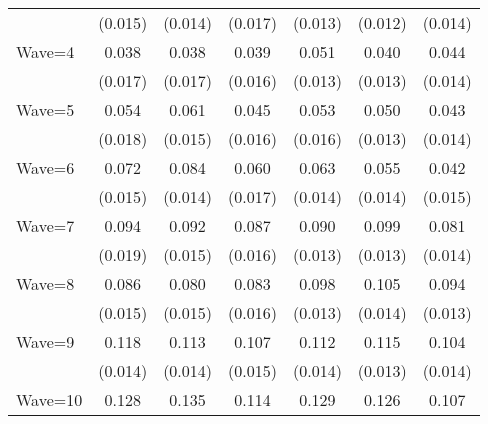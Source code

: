 {\begin{tabular}{l*{6}{c}}
                    &     (0.015)         &     (0.014)         &     (0.017)         &     (0.013)         &     (0.012)         &     (0.014)         \\
Wave=4              &       0.038\sym{**} &       0.038\sym{**} &       0.039\sym{**} &       0.051\sym{***}&       0.040\sym{***}&       0.044\sym{***}\\
                    &     (0.017)         &     (0.017)         &     (0.016)         &     (0.013)         &     (0.013)         &     (0.014)         \\
Wave=5              &       0.054\sym{***}&       0.061\sym{***}&       0.045\sym{***}&       0.053\sym{***}&       0.050\sym{***}&       0.043\sym{***}\\
                    &     (0.018)         &     (0.015)         &     (0.016)         &     (0.016)         &     (0.013)         &     (0.014)         \\
Wave=6              &       0.072\sym{***}&       0.084\sym{***}&       0.060\sym{***}&       0.063\sym{***}&       0.055\sym{***}&       0.042\sym{***}\\
                    &     (0.015)         &     (0.014)         &     (0.017)         &     (0.014)         &     (0.014)         &     (0.015)         \\
Wave=7              &       0.094\sym{***}&       0.092\sym{***}&       0.087\sym{***}&       0.090\sym{***}&       0.099\sym{***}&       0.081\sym{***}\\
                    &     (0.019)         &     (0.015)         &     (0.016)         &     (0.013)         &     (0.013)         &     (0.014)         \\
Wave=8              &       0.086\sym{***}&       0.080\sym{***}&       0.083\sym{***}&       0.098\sym{***}&       0.105\sym{***}&       0.094\sym{***}\\
                    &     (0.015)         &     (0.015)         &     (0.016)         &     (0.013)         &     (0.014)         &     (0.013)         \\
Wave=9              &       0.118\sym{***}&       0.113\sym{***}&       0.107\sym{***}&       0.112\sym{***}&       0.115\sym{***}&       0.104\sym{***}\\
                    &     (0.014)         &     (0.014)         &     (0.015)         &     (0.014)         &     (0.013)         &     (0.014)         \\
Wave=10             &       0.128\sym{***}&       0.135\sym{***}&       0.114\sym{***}&       0.129\sym{***}&       0.126\sym{***}&       0.107\sym{***}\\

\end{tabular}}
